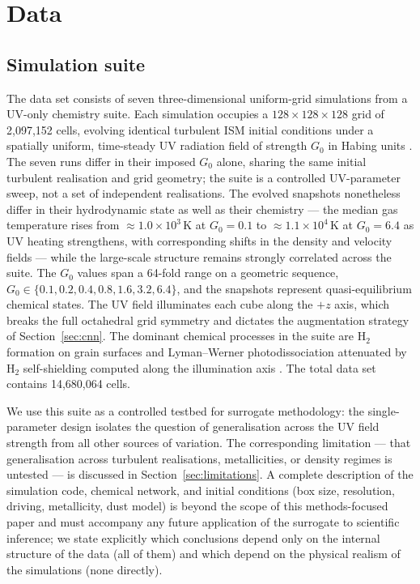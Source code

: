 \documentclass[fleqn,usenatbib]{rasti}
\newcommand{\Gzero}{G_0}
\begin{document}
\section{Data}
\label{sec:data}

\subsection{Simulation suite}
\label{sec:suite}

The data set consists of seven three-dimensional uniform-grid
simulations from a UV-only chemistry suite. Each simulation occupies a
\(128 \times 128 \times 128\) grid of 2,097,152 cells, evolving identical
turbulent ISM initial conditions under a spatially uniform, time-steady
UV radiation field of strength \(\Gzero\) in Habing units
\citep{Habing1968}. The seven runs differ in their imposed \(\Gzero\)
alone, sharing the same initial turbulent realisation and grid geometry;
the suite is a controlled UV-parameter sweep, not a set of independent
realisations. The evolved snapshots nonetheless differ in their
hydrodynamic state as well as their chemistry --- the median gas
temperature rises from \(\approx\)\(1.0\times10^{3}\)\,K at \(\Gzero = 0.1\)
to \(\approx\)\(1.1\times10^{4}\)\,K at \(\Gzero = 6.4\) as UV heating
strengthens, with corresponding shifts in the density and velocity
fields --- while the large-scale structure remains strongly correlated
across the suite. The \(\Gzero\)
values span a 64-fold range on a geometric sequence,
\(\Gzero \in \{0.1, 0.2, 0.4, 0.8, 1.6, 3.2, 6.4\}\), and the snapshots
represent quasi-equilibrium chemical states. The UV field illuminates
each cube along the \(+z\) axis, which breaks the full octahedral grid
symmetry and dictates the augmentation strategy of
Section~\ref{sec:cnn}. The dominant chemical processes in the suite are
H\(_2\) formation on grain surfaces \citep{Cazaux2004} and Lyman--Werner
photodissociation \citep{Draine1996} attenuated by H\(_2\) self-shielding
computed along the illumination axis \citep{Wolcott-Green2011}. The
total data set contains 14,680,064 cells.

We use this suite as a controlled testbed for surrogate methodology: the
single-parameter design isolates the question of generalisation across
the UV field strength from all other sources of variation. The
corresponding limitation --- that generalisation across turbulent
realisations, metallicities, or density regimes is untested --- is
discussed in Section~\ref{sec:limitations}. A complete description of
the simulation code, chemical network, and initial conditions
(box size, resolution, driving, metallicity, dust model) is beyond the
scope of this methods-focused paper and must accompany any future
application of the surrogate to scientific inference; we state
explicitly which conclusions depend only on the internal structure of
the data (all of them) and which depend on the physical realism of the
simulations (none directly).
\end{document}
